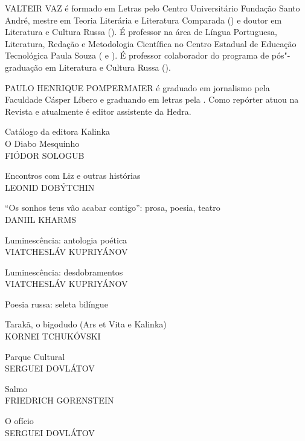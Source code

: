 \medskip

\noindent{}VALTEIR VAZ é formado em Letras pelo Centro Universitário Fundação Santo
André, mestre em Teoria Literária e Literatura Comparada () e doutor
em Literatura e Cultura Russa (). É professor na área de Língua
Portuguesa, Literatura, Redação e Metodologia Científica no Centro
Estadual de Educação Tecnológica Paula Souza ( e ). É professor
colaborador do programa de pós"-graduação em Literatura e Cultura Russa
().

\medskip

\noindent{}PAULO HENRIQUE POMPERMAIER é graduado em jornalismo pela Faculdade Cásper Líbero e graduando em letras pela . Como repórter atuou na Revista  e atualmente é editor assistente da Hedra.

\afterpage{\blankpage}

\newpage
\pagestyle{empty}
\MyriadPro

\noindent{}Catálogo da editora Kalinka\\[5pt]

\noindent{}O Diabo Mesquinho\\
FIÓDOR SOLOGUB
\medskip

\noindent{}Encontros com Liz e outras histórias\\
LEONID DOBÝTCHIN
\medskip

\noindent{}``Os sonhos teus vão acabar contigo'': prosa, poesia, teatro\\
DANIIL KHARMS
\medskip

\noindent{}Luminescência: antologia poética\\
VIATCHESLÁV KUPRIYÁNOV
\medskip

\noindent{}Luminescência: desdobramentos\\
VIATCHESLÁV KUPRIYÁNOV
\medskip

\noindent{}Poesia russa: seleta bilíngue
\medskip

\noindent{}Tarakã, o bigodudo (Ars et Vita e Kalinka)\\
KORNEI TCHUKÓVSKI
\medskip

\noindent{}Parque Cultural\\
SERGUEI DOVLÁTOV
\medskip

\noindent{}Salmo\\
FRIEDRICH GORENSTEIN
\medskip

\noindent{}O ofício\\
SERGUEI DOVLÁTOV
\medskip

